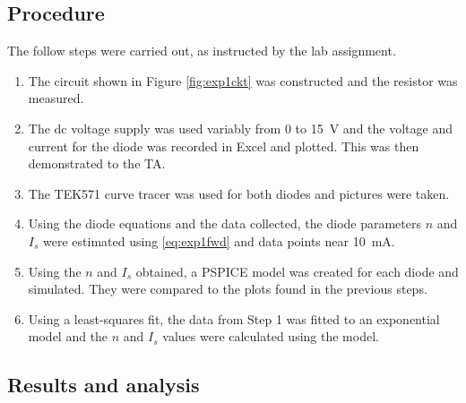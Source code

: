 \documentclass{report}
\begin{document}
\subsection{Procedure}
The follow steps were carried out, as instructed by the lab assignment.
\begin{enumerate}
	\item The circuit shown in Figure \ref{fig:exp1ckt} was constructed and the resistor was measured.
	\item The dc voltage supply was used variably from \num{0} to \SI{15}{\V} and the voltage and current for the diode was recorded in Excel and plotted. This was then demonstrated to the TA.
	\item The TEK571 curve tracer was used for both diodes and pictures were taken.
	\item Using the diode equations and the data collected, the diode parameters $n$ and $I_s$ were estimated using \eqref{eq:exp1fwd} and data points near \SI{10}{\mA}.
	\item Using the $n$ and $I_s$ obtained, a PSPICE model was created for each diode and simulated. They were compared to the plots found in the previous steps.
	\item Using a least-squares fit, the data from Step 1 was fitted to an exponential model and the $n$ and $I_s$ values were calculated using the model.
\end{enumerate}

\subsection{Results and analysis}
\end{document}
